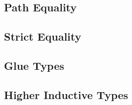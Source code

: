 \documentclass[a4paper,UKenglish,cleveref, autoref, thm-restate]{lipics-v2021}
\begin{document}
\newpage
\subsection{Path Equality}

\subsection{Strict Equality}

\subsection{Glue Types}

\subsection{Higher Inductive Types}
\end{document}
